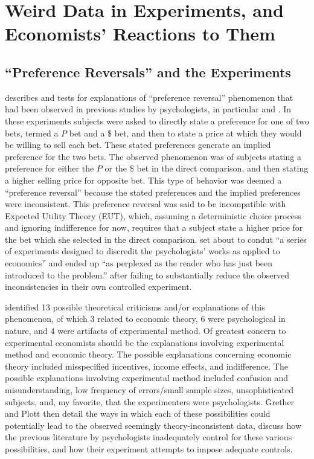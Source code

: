 \documentclass[../main.tex]{subfiles}
\begin{document}
\onehalfspacing
\setcounter{chapter}{0}
\chapter{Weird Data in Experiments, and Economists' Reactions to Them}

\lltoc

\section{\enquote{Preference Reversals} and the \texorpdfstring{\textcite{Grether1979}}{Grether \& Plott (1979)}  Experiments}

\textcite{Grether1979} describes and tests for explanations of \enquote{preference reversal} phenomenon that had been observed in previous studies by psychologists, in particular \textcite{Lichtenstein1971, Lichtenstein1973} and \textcite{Lindman1971}.
In these experiments subjects were asked to directly state a preference for one of two bets, termed a $P$ bet and a \$ bet,  and then to state a price at which they would be willing to sell each bet.
These stated preferences generate an implied preference for the two bets.
The observed phenomenon was of subjects stating a preference for either the $P$ or the \$ bet in the direct comparison, and then stating a higher selling price for opposite bet.
This type of behavior was deemed a \enquote{preference reversal} because the stated preferences and the implied preferences were inconsistent.
This preference reversal was said to be incompatible with Expected Utility Theory (EUT), which, assuming a deterministic choice process and ignoring indifference for now, requires that a subject state a higher price for the bet which she selected in the direct comparison.
\textcite[623]{Grether1979} set about to condut \enquote{a series of experiments designed to discredit the psychologists' works as applied to economics} and ended up \enquote{as perplexed as the reader who has just been introduced to the problem.} \parencite*[624]{Grether1979} after failing to substantially reduce the observed inconsistencies in their own controlled experiment.

\textcite{Grether1979} identified 13 possible theoretical criticisms and/or explanations of this phenomenon, of which 3 related to economic theory, 6 were psychological in nature, and 4 were artifacts of experimental method.
Of greatest concern to experimental economists should be the explanations involving experimental method and economic theory.
The possible explanations concerning economic theory included misspecified incentives, income effects, and indifference.
The possible explanations involving experimental method included confusion and misunderstanding, low frequency of errors/small sample sizes, unsophisticated subjects, and, my favorite, that the experimenters were psychologists.
Grether and Plott then detail the ways in which each of these possibilities could potentially lead to the observed seemingly theory-inconsistent data, discuss how the previous literature by psychologists inadequately control for these various possibilities, and how their experiment attempts to impose adequate controls.
\end{document}
